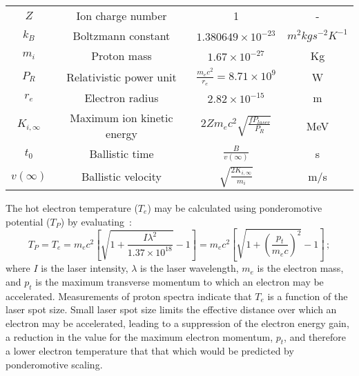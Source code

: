 \begin{table}
\begin{center}
\begin{tabular}{c c c c}
      $Z$ & Ion charge number & 1 & - \\  
      $k_{B}$ & Boltzmann constant & $1.380649 \times 10^{-23}$ & $m^{2} kg s^{-2} K^{-1}$ \\  
      $m_{i}$ & Proton mass & $1.67 \times 10^{-27}$ & Kg \\ 
      $P_{R}$ & Relativistic power unit & $\frac{m_{e} c^{2}}{r_{e}} = 8.71 \times 10^{9}$ & W \\  
      $r_{e}$ & Electron radius & $2.82 \times 10^{-15}$ & m \\  
      $K_{i,\infty}$ & Maximum ion kinetic energy & $2 Z m_{e} c^{2} \sqrt{\frac{f P_{laser}}{P_{R}}}$ & MeV \\  
      $t_{0}$ & Ballistic time & $\frac{B}{v(\infty)}$ & s \\  
      $v(\infty)$ & Ballistic velocity & $\sqrt{\frac{2 K_{i,\infty}}{m_{i}}}$ & m/s \\  
      \hline
    \end{tabular}
  \end{center}
\end{table}

The hot electron temperature ($T_e$) may be calculated using
ponderomotive potential ($T_P$) by
evaluating~\cite{10.1038/nphys199}: 
\begin{equation}
  T_P = T_e = m_{e} c^{2}
                \left[
                  \sqrt{1 + \frac{I \lambda^{2}}{1.37 \times 10^{18}}} - 1
                \right]
            = m_{e} c^{2}
                \left[
                  \sqrt{1 + \left(\frac{p_t}{m_e c}\right)^2} - 1
                \right] \,
            ;
  \label{Eq:ElectronTemp}
\end{equation}
where $I$ is the laser intensity, $\lambda$ is the laser wavelength,
$m_e$ is the electron mass, and $p_t$ is the maximum transverse
momentum to which an electron may be accelerated.
Measurements of proton spectra indicate that $T_e$ is a function of
the laser spot size.
Small laser spot size limits the effective distance over which an
electron may be accelerated, leading to a suppression of the electron
energy gain, a reduction in the value for the maximum electron
momentum, $p_t$, and therefore a lower electron temperature that that
which would be predicted by ponderomotive scaling.

